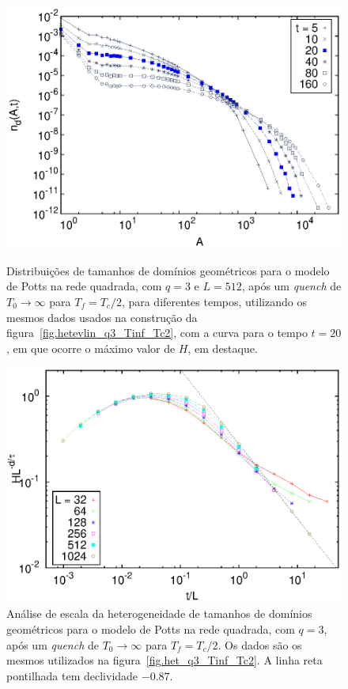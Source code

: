 \begin{figure}[p]
 \centering
 \includegraphics[width=14cm]{fig/areasev_q3_L512_Tinf_Tc2.eps}
 \caption{Distribuições de tamanhos de domínios geométricos para o modelo de Potts na rede quadrada, com $q=3$ e $L=512$, após um \textit{quench} de $T_0\rightarrow \infty$ para $T_f=T_c/2$, para diferentes tempos, utilizando os mesmos dados usados na construção da figura~\ref{fig.hetevlin_q3_Tinf_Tc2}, com a curva para o tempo $t=20$, em que ocorre o máximo valor de $H$, em destaque.}
\label{fig.areasev_q3_L512_Tinf_Tc2}
\vspace{8mm}
 \includegraphics[width=14cm]{fig/het_q3_Tinf_Tc2_colXY.eps}
 \caption{Análise de escala da heterogeneidade de tamanhos de domínios geométricos para o modelo de Potts na rede quadrada, com $q=3$, após um \textit{quench} de $T_0\rightarrow \infty$ para $T_f=T_c/2$. Os dados são os mesmos utilizados na figura~\ref{fig.het_q3_Tinf_Tc2}. A linha reta pontilhada tem declividade $-0.87$.}
\label{fig.het_q3_Tinf_Tc2_colXY}
\end{figure}


